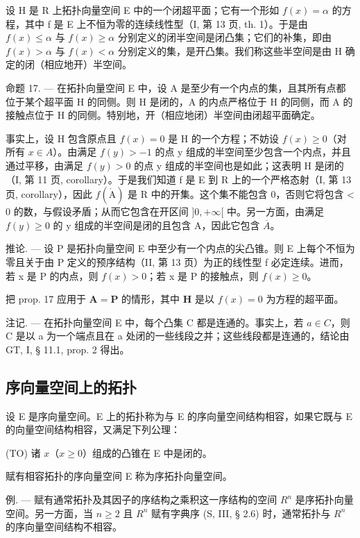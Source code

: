 设 H 是 R 上拓扑向量空间 E 中的一个闭超平面；它有一个形如 \(f(x) = \alpha\) 的方程，其中 f 是 E 上不恒为零的连续线性型（I, 第 13 页, th. 1）。于是由 \(f(x) \leqslant \alpha\) 与 \(f(x) \geqslant \alpha\) 分别定义的闭半空间是闭凸集；它们的补集，即由 \(f(x) > \alpha\) 与 \(f(x) < \alpha\) 分别定义的集，是开凸集。我们称这些半空间是由 H 确定的闭（相应地开）半空间。

命题 17. --- 在拓扑向量空间 E 中，设 A 是至少有一个内点的集，且其所有点都位于某个超平面 H 的同侧。则 H 是闭的，A 的内点严格位于 H 的同侧，而 A 的接触点位于 H 的同侧。特别地，开（相应地闭）半空间由闭超平面确定。

事实上，设 H 包含原点且 \(f(x) = 0\) 是 H 的一个方程；不妨设 \(f(x) \geqslant 0\)（对所有 \(x \in A\)）。由满足 \(f(y) > -1\) 的点 y 组成的半空间至少包含一个内点，并且通过平移，由满足 \(f(y) > 0\) 的点 y 组成的半空间也是如此；这表明 H 是闭的（I, 第 11 页, corollary）。于是我们知道 f 是 E 到 R 上的一个严格态射（I, 第 13 页, corollary），因此 \(f(\mathring{\mathrm{A}})\) 是 R 中的开集。这个集不能包含 0，否则它将包含 \textless{} 0 的数，与假设矛盾；从而它包含在开区间 \(\bigg]0, +\infty[\) 中。另一方面，由满足 \(f(y) \geqslant 0\) 的 y 组成的半空间是闭的且包含 A，因此它包含 \(\overline{A}\)。

推论. --- 设 P 是拓扑向量空间 E 中至少有一个内点的尖凸锥。则 E 上每个不恒为零且关于由 P 定义的预序结构（II, 第 13 页）为正的线性型 f 必定连续。进而，若 x 是 P 的内点，则 \(f(x) > 0\)；若 x 是 P 的接触点，则 \(f(x) \geqslant 0\)。

把 prop. 17 应用于 \(\mathbf{A} = \mathbf{P}\) 的情形，其中 \(\mathbf{H}\) 是以 \(f(x) = 0\) 为方程的超平面。

注记. --- 在拓扑向量空间 E 中，每个凸集 C 都是连通的。事实上，若 \(a \in C\)，则 C 是以 a 为一个端点且在 a 处闭的一些线段之并；这些线段都是连通的，结论由 GT, I, § 11.1, prop. 2 得出。

\subsection{序向量空间上的拓扑}

设 E 是序向量空间。E 上的拓扑称为与 E 的序向量空间结构相容，如果它既与 E 的向量空间结构相容，又满足下列公理：

(TO) 诸 \(x\)（\(x \geqslant 0\)）组成的凸锥在 E 中是闭的。

赋有相容拓扑的序向量空间 E 称为序拓扑向量空间。

例. --- 赋有通常拓扑及其因子的序结构之乘积这一序结构的空间 \(R^{n}\) 是序拓扑向量空间。另一方面，当 \(n \geqslant 2\) 且 \(R^{n}\) 赋有字典序 (S, III, § 2.6) 时，通常拓扑与 \(R^{n}\) 的序向量空间结构不相容。

